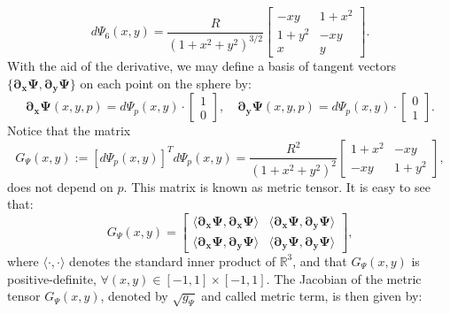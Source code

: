 \begin{equation*}
	d\Psi_{6}(x,y) = \frac{R}{{(1 + x^2 + y^2)}^{3/2}}
	\begin{bmatrix}
		 -xy  &  1+x^2 \\
		 1+y^2  &  -xy \\
		 x &  y
	\end{bmatrix}.
\end{equation*}
With the aid of the derivative, we may define a basis of tangent vectors 
$\{\boldsymbol{\partial_x \Psi},  \boldsymbol{\partial_y \Psi}\}$ on each point on the sphere by:
\begin{equation*}
	\boldsymbol{\partial_x \Psi}(x,y,p) = d\Psi_{p}(x,y) \cdot
	\begin{bmatrix}
		 1 \\
		 0
	\end{bmatrix}, \quad
	\boldsymbol{\partial_y \Psi}(x,y,p) = d\Psi_{p}(x,y) \cdot
	\begin{bmatrix}
		 0 \\
		 1
	\end{bmatrix}.
\end{equation*}
Notice that the matrix
\begin{equation*}
	\label{chp-cs-eqdistant-Psitensor}
	G_{\Psi}(x,y) := 
	[d\Psi_{p}(x,y)]^Td\Psi_{p}(x,y)
	= \frac{R^2}{(1 + x^2 + y^2)^2}
	\begin{bmatrix}
		  1+ x^2 &  -xy \\
		 -xy & 1 + y^2
	\end{bmatrix},
\end{equation*}
does not depend on $p$.
This matrix is known as metric tensor.
It is easy to see that:
\begin{equation}
	\label{chp-cs-eqdistant-Psi-metric-tensor}
	G_{\Psi}(x,y) = 
	\begin{bmatrix}
		\langle  \boldsymbol{\partial_x \Psi}, \boldsymbol{\partial_x \Psi} \rangle & 
		\langle  \boldsymbol{\partial_x \Psi}, \boldsymbol{\partial_y \Psi} \rangle \\
		\langle  \boldsymbol{\partial_x \Psi}, \boldsymbol{\partial_y \Psi} \rangle  &
		\langle  \boldsymbol{\partial_y \Psi}, \boldsymbol{\partial_y \Psi} \rangle 
	\end{bmatrix},
\end{equation}
where $\langle \cdot, \cdot \rangle$ denotes 
the standard inner product of $\mathbb{R}^3$,
and that $G_{\Psi}(x,y)$ is positive-definite, 
$\forall (x,y) \in [-1,1]\times[-1,1]$.
The Jacobian of the metric tensor $G_{\Psi}(x,y)$, denoted by $\sqrt{g_{\Psi}}$ and called metric term, is then given by:
